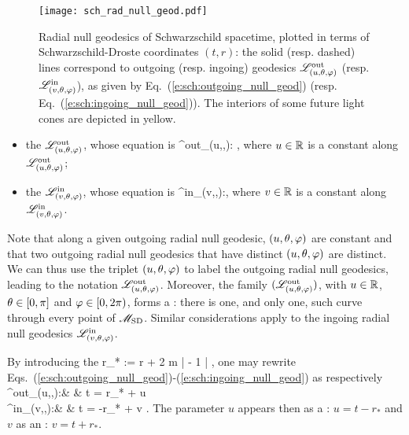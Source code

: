 \begin{figure}
\centerline{\texttt{[image: sch\_rad\_null\_geod.pdf]}}
\caption[]{\label{f:sch:rad_null_geod} \footnotesize
Radial null geodesics of Schwarzschild spacetime, plotted in terms
of Schwarzschild-Droste coordinates $(t,r)$: the solid (resp. dashed) lines
correspond to outgoing (resp. ingoing) geodesics $\mathscr{L}^{\rm out}_{(u,\theta,\varphi)}$
(resp. $\mathscr{L}^{\rm in}_{(v,\theta,\varphi)}$), as given by Eq.~(\ref{e:sch:outgoing_null_geod})
(resp. Eq.~(\ref{e:sch:ingoing_null_geod})). The interiors of some future light
cones are depicted in yellow.}
\end{figure}

\begin{itemize}
\item the 
$\mathscr{L}^{\rm out}_{(u,\theta,\varphi)}$, whose
equation is
\be \label{e:sch:outgoing_null_geod}
   \Li^{\rm out}_{(u,\th,\ph)}:\quad
   ,
\ee
where $u\in \mathbb{R}$ is a constant along $\mathscr{L}^{\rm out}_{(u,\theta,\varphi)}$;
\item  the 
$\mathscr{L}^{\rm in}_{(v,\theta,\varphi)}$, whose
equation is
\be \label{e:sch:ingoing_null_geod}
 \Li^{\rm in}_{(v,\th,\ph)}:\quad  {},
\ee
where $v\in \mathbb{R}$ is a constant along $\mathscr{L}^{\rm in}_{(v,\theta,\varphi)}$.
\end{itemize}
Note that along a given outgoing radial null geodesic, $(u,\theta,\varphi)$ are constant and that
two outgoing radial null geodesics that have distinct $(u,\theta,\varphi)$ are distinct. We can thus
use the triplet $(u,\theta,\varphi)$ to label the outgoing radial null geodesics,
leading to the notation $\mathscr{L}^{\rm out}_{(u,\theta,\varphi)}$. Moreover, the family $(\mathscr{L}^{\rm out}_{(u,\theta,\varphi)})$,
with $u\in\mathbb{R}$, $\theta\in[0,\pi]$ and $\varphi \in [0, 2\pi)$, %
forms a : there is one, and only one, such curve through
every point of $\mathscr{M}_{\rm SD}$. Similar considerations apply to the ingoing radial null geodesics
$\mathscr{L}^{\rm in}_{(v,\theta,\varphi)}$.

By introducing the 
\be \label{e:sch:def_tortoise}
    r_* := r + 2 m \ln \left|  - 1 \right| ,
\ee
one may rewrite Eqs.~(\ref{e:sch:outgoing_null_geod})-(\ref{e:sch:ingoing_null_geod}) as
respectively
\bea
  \Li^{\rm out}_{(u,\th,\ph)}:\quad  &  & t = r_* + u \\
  \Li^{\rm in}_{(v,\th,\ph)}:\quad  &  & t = -r_* + v . \label{e:sch:v_advanced_tortoise}
\eea
The parameter $u$ appears then as a
:
$u = t - r_*$ and $v$ as an
: $v = t + r_*$.

